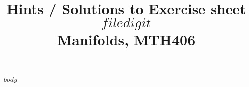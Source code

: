 \documentclass[a4paper]{article}
\title{Hints / Solutions to Exercise sheet $filedigit$\\ {\small Manifolds, MTH406} }
\date{}
\begin{document}
\maketitle
$body$
\end{document}
